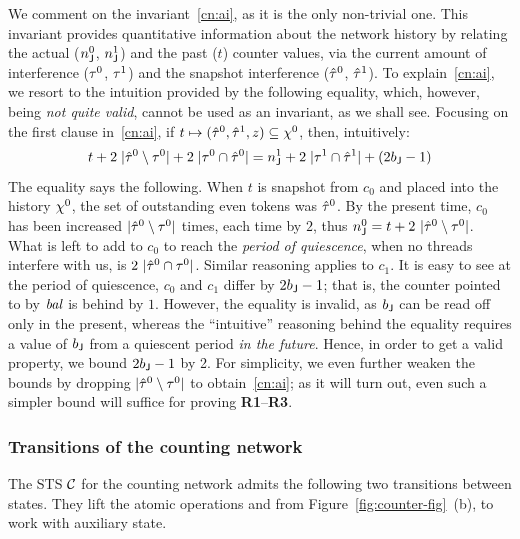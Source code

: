 We comment on the invariant~\ref{cn:ai}, as it is the only non-trivial
one. This invariant provides quantitative information about the
network history by relating the actual ($n^0_{\mathsf{J}}$, $n^1_{\mathsf{J}}$)
and the past ($t$) counter values, via the current amount of
interference ($\tau^0$, $\tau^1$) and the snapshot interference
($\hat{\tau}^0$, $\hat{\tau}^1$). 
%
%
To explain~\ref{cn:ai}, we resort to the intuition provided by the
following equality, which, however, being \emph{not quite valid},
cannot be used as an invariant, as we shall see. Focusing on the
first clause in~\ref{cn:ai}, if
$t \mapsto (\hat{\tau}^0, \hat{\tau}^1, z) \subseteq \chi^0$, then,
intuitively:
%
\[
{\small{
t + 2\ |\tknh^0 \setminus \tkn^0 | + 2\ |\tkn^0 \cap \tknh^0| =
n^1_\joint + 2\ |\tkn^1 \cap \tknh^1| + (2 b_\joint - 1)
}}
\]
%
The equality says the following. When $t$ is snapshot from $c_0$ and
placed into the history $\chi^0$, the set of outstanding even tokens
was $\hat{\tau}^0$. By the present time, $c_0$ has been increased
$|\hat{\tau}^0 \setminus \tau^0|$ times, each time by $2$, thus
$n^0_{\mathsf{J}} = t + 2\ |\hat{\tau}^0 \setminus \tau^0|$. What is left to add
to $c_0$ to reach the \emph{period of quiescence}, when no threads
interfere with us, is $2\ |\hat{\tau}^0 \cap \tau^0|$. Similar reasoning
applies to $c_1$. It is easy to see at the period of quiescence, $c_0$
and $c_1$ differ by $2 b_{\mathsf{J}} - 1$; that is, the counter pointed to
by $\mathit{bal}$ is behind by $1$. However, the equality is invalid, as
$b_{\mathsf{J}}$ can be read off only in the present, whereas the
``intuitive'' reasoning behind the equality requires a value of
$b_{\mathsf{J}}$ from a quiescent period \emph{in the future}. Hence, in
order to get a valid property, we bound $2 b_{\mathsf{J}} - 1$ by 2. For
simplicity, we even further weaken the bounds by dropping
$|\hat{\tau}^0 \setminus \tau^0|$ to obtain~\ref{cn:ai}; as it will turn
out, even such a simpler bound will suffice for proving
\textbf{R1}--\textbf{R3}.



\subsubsection{Transitions of the counting network}
\label{sec:count-netw-prot}
The STS $\cal C$ for the counting network admits the following two
transitions between states. They lift the atomic operations
 and  from
Figure~\ref{fig:counter-fig}~(b), to work with auxiliary state.

